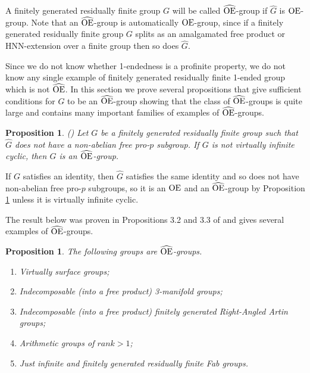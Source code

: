 \documentclass[a4paper,12pt]{article}
\newtheorem{prop}[thm]{Proposition}
\newcommand{\Oe}{\rm \widehat{OE}}
\def\OE{{\rm OE}}
\begin{document}
{ A finitely generated residually finite group $G$  will be called $\Oe$-group if $\widehat G$ is $\OE$-group. Note that an $\Oe$-group is automatically $\OE$-group, since if a finitely generated residually finite group $G$ splits as an amalgamated free product or HNN-extension over a finite group then so does $\widehat G$.  


Since we do not know whether 1-endedness is a profinite property, we do not know any single example of finitely generated residually finite 1-ended group which is not $\Oe$.  In this section we prove   
 several propositions that give  sufficient conditions for $G$ to be an $\Oe$-group  showing that the class of $\Oe$-groups is quite large and contains many important families of examples of $\Oe$-groups.


\begin{prop}\label{virtually cyclic}(\cite[Proposition 3.1]{BPZ}) Let $G$ be a finitely generated residually finite group such that $\widehat G$ does not have a non-abelian free pro-$p$ subgroup. If  $G$ is not virtually infinite cyclic, then $G$ is an $\Oe$-group.
\end{prop}


 
 
If $G$   satisfies an identity, then $\widehat G$ satisfies the same identity and so does not have non-abelian free  pro-$p$ subgroups, so it is an $\OE$ and an $\Oe$-group by Proposition \ref{virtually cyclic} unless it is virtually infinite cyclic. %


The result below was proven in Propositions 3.2 and 3.3 of \cite{BPZ2} and gives several examples of $\Oe$-groups.

\begin{prop}\label{examples} The following groups are $\Oe$-groups. \begin{enumerate}
\item[(i)]  Virtually surface groups;
\item[(ii)] Indecomposable (into a free product) 3-manifold groups;
\item[(iii)] Indecomposable (into a free product) finitely generated Right-Angled Artin groups;
 \item[(iv)] Arithmetic groups of $rank >1$;
 \item[(v)] Just infinite and finitely generated residually finite Fab groups. 
 \end{enumerate}
\end{prop}  

}
\end{document}
